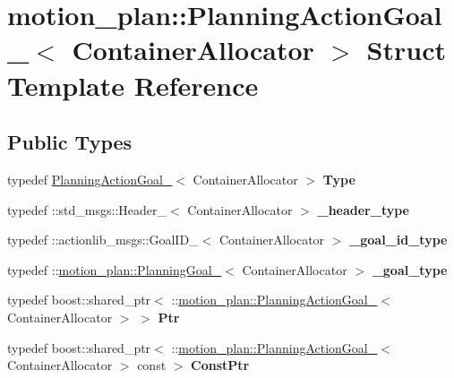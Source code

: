 \hypertarget{structmotion__plan_1_1PlanningActionGoal__}{}\section{motion\+\_\+plan\+:\+:Planning\+Action\+Goal\+\_\+$<$ Container\+Allocator $>$ Struct Template Reference}
\label{structmotion__plan_1_1PlanningActionGoal__}
\subsection*{Public Types}
\begin{DoxyCompactItemize}
\item 
\mbox{\label{structmotion__plan_1_1PlanningActionGoal___aec859cca986f29b38b083018f367c3c7}} 
typedef \hyperlink{structmotion__plan_1_1PlanningActionGoal__}{Planning\+Action\+Goal\+\_\+}$<$ Container\+Allocator $>$ {\bfseries Type}
\item 
\mbox{\label{structmotion__plan_1_1PlanningActionGoal___a52a088504b3f7dac1605722694d8b0a4}} 
typedef \+::std\+\_\+msgs\+::\+Header\+\_\+$<$ Container\+Allocator $>$ {\bfseries \+\_\+header\+\_\+type}
\item 
\mbox{\label{structmotion__plan_1_1PlanningActionGoal___af0f4efbe0c7a854b8e7e046a6a24e0cb}} 
typedef \+::actionlib\+\_\+msgs\+::\+Goal\+I\+D\+\_\+$<$ Container\+Allocator $>$ {\bfseries \+\_\+goal\+\_\+id\+\_\+type}
\item 
\mbox{\label{structmotion__plan_1_1PlanningActionGoal___a2523d6ba987840edfad4d9b077821f72}} 
typedef \+::\hyperlink{structmotion__plan_1_1PlanningGoal__}{motion\+\_\+plan\+::\+Planning\+Goal\+\_\+}$<$ Container\+Allocator $>$ {\bfseries \+\_\+goal\+\_\+type}
\item 
\mbox{\label{structmotion__plan_1_1PlanningActionGoal___aed22d9e397e51cb88c8b965ba0e63dde}} 
typedef boost\+::shared\+\_\+ptr$<$ \+::\hyperlink{structmotion__plan_1_1PlanningActionGoal__}{motion\+\_\+plan\+::\+Planning\+Action\+Goal\+\_\+}$<$ Container\+Allocator $>$ $>$ {\bfseries Ptr}
\item 
\mbox{\label{structmotion__plan_1_1PlanningActionGoal___abebd33b5ae39280b17300e48a6367158}} 
typedef boost\+::shared\+\_\+ptr$<$ \+::\hyperlink{structmotion__plan_1_1PlanningActionGoal__}{motion\+\_\+plan\+::\+Planning\+Action\+Goal\+\_\+}$<$ Container\+Allocator $>$ const  $>$ {\bfseries Const\+Ptr}
\end{DoxyCompactItemize}
